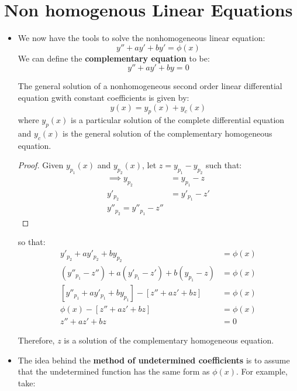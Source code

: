 \section{Non homogenous Linear Equations}
\begin{itemize}
    \item We now have the tools to solve the nonhomogeneous linear equation:
    \begin{equation}
        y''+ay'+by' = \phi(x)
        \label{eq:}
    \end{equation}
    We can define the \textbf{complementary equation} to be:
    \begin{equation}
        y''+ay'+by= 0
        \label{eq:}
    \end{equation}
    \begin{theorem}
        The general solution of a nonhomogeneous second order linear differential equation gwith constant coefficients is given by:
        \begin{equation}
            y(x)=y_p(x)+y_c(x)
            \label{eq:}
        \end{equation}
        where $y_p(x)$ is a particular solution of the complete differential equation and $y_c(x)$ is the general solution of the complementary homogeneous equation.
        \begin{proof}
            Given $y_{p_1}(x)$ and $y_{p_2}(x)$, let $z=y_{p_1}-y_{p_2}$ such that:
            \begin{align}
                \implies y_{p_2} &= y_{p_1} - z \\ 
                y'_{p_2} &= y'_{p_1} - z' \\ 
                y''_{p_2} = y''_{p_1} - z''
            \end{align}
        \end{proof}
        so that:
        \begin{align}
            y'_{p_2}+ay'_{p_2}+by_{p_2} &= \phi(x) \\
            (y''_{p_1}-z'') + a(y'_{p_1}-z')+b(y_{p_1}-z) &= \phi (x) \\
            [y''_{p_1}+ay'_{p_1}+by_{p_1}] - [z''+az'+bz] &= \phi(x) \\ 
            \phi(x) - [z''+az'+bz] &= \phi(x) \\ 
            z''+az'+bz &= 0
        \end{align}
    \end{theorem}
    Therefore, $z$ is a solution of the complementary homogeneous equation.
    \item The idea behind the \textbf{method of undetermined coefficients} is to assume that the undetermined function has the same form as $\phi(x)$. For example, take:

\end{itemize}
